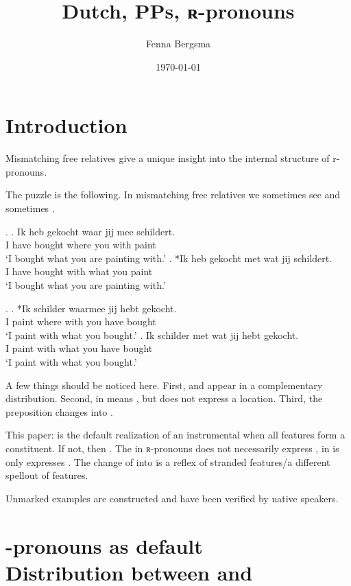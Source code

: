 \documentclass{article}
\title{Dutch, PPs, ʀ-pronouns}
\author{Fenna Bergsma}
\date{\today}
\begin{document}
\maketitle




\section{Introduction}

Mismatching free relatives give a unique insight into the internal structure of r-pronouns.

The puzzle is the following. In mismatching free relatives we sometimes see  and sometimes .

\ex.
\ag. Ik heb gekocht waar jij mee schildert.\\
 I have bought where you with paint\\
 `I bought what you are painting with.'
\bg. *Ik heb gekocht met wat jij schildert.\\
 I have bought with what you paint\\
 `I bought what you are painting with.'

\ex.
\ag. *Ik schilder waarmee jij hebt gekocht.\\
 I paint {where with} you have bought\\
 `I paint with what you bought.'
\bg. Ik schilder met wat jij hebt gekocht.\\
 I paint with what you have bought\\
 `I paint with what you bought.'

A few things should be noticed here. First,  and  appear in a complementary distribution. Second,  in  means , but  does not express a location. Third, the preposition  changes into .

This paper:  is the default realization of an instrumental when all features form a constituent. If not, then . The  in ʀ-pronouns does not necessarily express , in  is only expresses . The change of  into  is a reflex of stranded features/a different spellout of features.

Unmarked examples are constructed and have been verified by native speakers.



\section{-pronouns as default \\
Distribution between  and }
\end{document}
